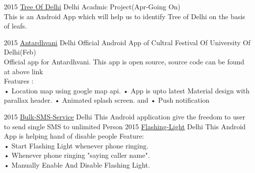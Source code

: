 \documentclass[]{friggeri-cv}
\begin{document}
\begin{entrylist}
  \entry
    {2015}
    {\href{https://github.com/teamDAPSR/Trees-of-Delhi}{Tree Of Delhi}}
    {{Delhi}}
    {{Acadmic Project(Apr-Going On)} \\This is an Android App which will help us to identify Tree of Delhi on the basis of leafs.}

  \entry
    {2015}
    {\href{https://github.com/teamDAPSR/Antardhvani}{Antardhvani}}
    {{Delhi}}
    {{Official Android App of Cultral Festival Of University Of Delhi(Feb)} \\Official app for Antardhvani. This app is open source, source code can be found at above link\\
    Features :\\ • Location map using google map api. • App is upto latest Material design with parallax header. • Animated splash screen. and • Push notification}

  \entry
    {2015}
    {\href{https://github.com/therajanmaurya/Bulk-SMS-Service-final}{Bulk-SMS-Service}}
    {Delhi}
    {This Android application give the freedom to user to send single SMS to unlimited Person }
  \entry
    {2015}
    {\href{https://github.com/therajanmaurya/Flashing-Light}{Flashing-Light}}
    {Delhi}
    {This Android App is helping hand of disable people
    Feature:\\• Start Flashing Light whenever phone ringing. \\
    • Whenever phone ringing "saying caller name".\\
    • Manually Enable And Disable Flashing Light. }
\end{entrylist}
\end{document}
